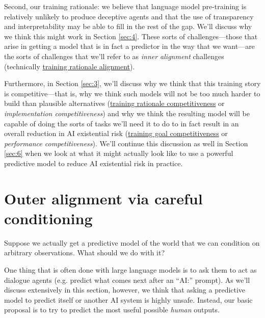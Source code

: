 \documentclass[
  onecolumn,
  natbib,
]{miri-tech-article}
\begin{document}
Second, our training rationale: we believe that language model pre-training is relatively unlikely to produce deceptive agents and that the use of transparency and interpretability may be able to fill in the rest of the gap. We'll discuss why we think this might work in Section \ref{sec:4}. These sorts of challenges---those that arise in getting a model that is in fact a predictor in the way that we want---are the sorts of challenges that we'll refer to as \textit{inner alignment} challenges (technically \href{https://www.alignmentforum.org/posts/FDJnZt8Ks2djouQTZ/how-do-we-become-confident-in-the-safety-of-a-machine#Evaluating_proposals_for_building_safe_advanced_AI}{training rationale alignment}\cite{how_become_confident}).

Furthermore, in Section \ref{sec:3}, we'll discuss why we think that this training story is competitive---that is, why we think such models will not be too much harder to build than plausible alternatives (\href{https://www.alignmentforum.org/posts/FDJnZt8Ks2djouQTZ/how-do-we-become-confident-in-the-safety-of-a-machine#Evaluating_proposals_for_building_safe_advanced_AI}{training rationale competitiveness}\cite{how_become_confident} or \textit{implementation competitiveness}) and why we think the resulting model will be capable of doing the sorts of tasks we'll need it to do to in fact result in an overall reduction in AI existential risk (\href{https://www.alignmentforum.org/posts/FDJnZt8Ks2djouQTZ/how-do-we-become-confident-in-the-safety-of-a-machine#Evaluating_proposals_for_building_safe_advanced_AI}{training goal competitiveness}\cite{how_become_confident} or \textit{performance competitiveness}). We'll continue this discussion as well in Section \ref{sec:6} when we look at what it might actually look like to use a powerful predictive model to reduce AI existential risk in practice.


\section{Outer alignment via careful conditioning}
\label{sec:2}

Suppose we actually get a predictive model of the world that we can condition on arbitrary observations. What should we do with it?

One thing that is often done with large language models is to ask them to act as dialogue agents (e.g. predict what comes next after an ``AI:'' prompt). As we'll discuss extensively in this section, however, we think that asking a predictive model to predict itself or another AI system is highly unsafe. Instead, our basic proposal is to try to predict the most useful possible \textit{human} outputs.
\end{document}
